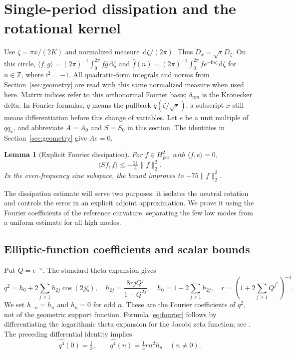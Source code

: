 \documentclass[a4paper,11pt]{article}
\numberwithin{equation}{section}
\newtheorem{lemma}[theorem]{Lemma}
\theoremstyle{definition}
\theoremstyle{remark}
\newcommand{\Z}{\mathbb Z}
\newcommand{\dd}{\,\mathrm d}
\newcommand{\ii}{\mathrm i}
\newcommand{\per}{\mathrm{per}}
\newcommand{\norm}[1]{\lVert#1\rVert}
\newcommand{\ip}[2]{\langle#1,#2\rangle}
\begin{document}
\section{Single-period dissipation and the rotational kernel}\label{app:single}\label{sec:spectrum}
Use $\zeta=\pi x/(2K)$ and normalized measure $\dd\zeta/(2\pi)$. Thus $D_x=\sqrt rD_\zeta$. On this circle, $\ip f g=(2\pi)^{-1}\int_0^{2\pi}f\overline g\dd\zeta$ and $\widehat f(n)=(2\pi)^{-1}\int_0^{2\pi}f e^{-\ii n\zeta}\dd\zeta$ for $n\in\Z$, where $\ii^2=-1$. All quadratic-form integrals and norms from Section~\ref{sec:geometry} are read with this same normalized measure when used here. Matrix indices refer to this orthonormal Fourier basis; $\delta_{nm}$ is the Kronecker delta. In Fourier formulas, $q$ means the pullback $q(\zeta/\sqrt r)$; a subscript $x$ still means differentiation before this change of variables. Let $e$ be a unit multiple of $qq_x$, and abbreviate $A=A_0$ and $S=S_0$ in this section. The identities in Section~\ref{sec:geometry} give $Ae=0$.
\begin{lemma}[Explicit Fourier dissipation]\label{lem:coercivity}
For $f\in H^2_\per$ with $\ip f e=0$,
\begin{equation}\label{eq:coercivity}
\ip{Sf}f\le-\tfrac{21}{4}\norm f_2^2.
\end{equation}
In the even-frequency sine subspace, the bound improves to $-75\norm f_2^2$.
\end{lemma}


The dissipation estimate will serve two purposes: it isolates the neutral rotation and controls the error in an explicit adjoint approximation. We prove it using the Fourier coefficients of the reference curvature, separating the few low modes from a uniform estimate for all high modes.

\subsection{Elliptic-function coefficients and scalar bounds}
Put $Q=e^{-\pi}$. The standard theta expansion gives
\begin{equation}\label{eq:fourier}
 q^2=h_0+2\sum_{j\ge1}h_{2j}\cos(2j\zeta),\quad
 h_{2j}=\frac{8rjQ^j}{1-Q^{2j}},\quad h_0=1-2\sum_{j\ge1}h_{2j},\quad
 r=\left(1+2\sum_{j\ge1}Q^{j^2}\right)^{-4}.
\end{equation}
We set $h_{-n}=h_n$ and $h_n=0$ for odd $n$. These are the Fourier coefficients of $q^2$, not of the geometric support function. Formula \eqref{eq:fourier} follows by differentiating the logarithmic theta expansion for the Jacobi zeta function; see \cite{DLMF}. The preceding differential identity implies
\begin{equation}\label{eq:q4}
 \widehat{q^4}(0)=\tfrac13,\qquad
 \widehat{q^4}(n)=\tfrac13rn^2h_n\quad(n\ne0).
\end{equation}
\end{document}

